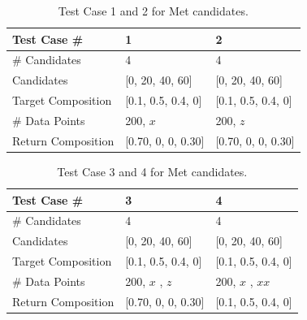 \begin{table} 
\begin{center}
\begin{tabular}{| l | l | l |  }
\hline
Test Case \# & 1 & 2 \\
\hline
\# Candidates & 4 & 4 \\
\hline
Candidates & [0, 20, 40, 60] & [0, 20, 40, 60] \\
\hline
Target Composition & [0.1, 0.5, 0.4, 0] & [0.1, 0.5, 0.4, 0] \\
\hline
\# Data Points & 200, $x$ & 200, $z$ \\
\hline
Return Composition & [0.70, 0, 0, 0.30] & [0.70, 0, 0, 0.30] \\
\hline
\end{tabular} 
\end{center}
\caption{Test Case 1 and 2 for Met candidates.} 
\label{tab:4.1}
\end{table}	

\begin{table} 
\begin{center}
\begin{tabular}{| l | p{3cm}| p{3cm} | }
\hline
Test Case \# & 3 & 4 \\
\hline
\# Candidates & 4 & 4  \\
\hline
Candidates & [0, 20, 40, 60] & [0, 20, 40, 60]\\
\hline
Target Composition & [0.1, 0.5, 0.4, 0] & [0.1, 0.5, 0.4, 0]\\
\hline
\# Data Points & 200, $x$ \newline 200, $z$ & 200, $x$ \newline 200, $xx$\\
\hline
Return Composition & [0.70, 0, 0, 0.30] & [0.1, 0.5, 0.4, 0]\\
\hline
\end{tabular} 
\end{center}
\caption{Test Case 3 and 4 for Met candidates.} 
\label{tab:case3and4}
\end{table}	

